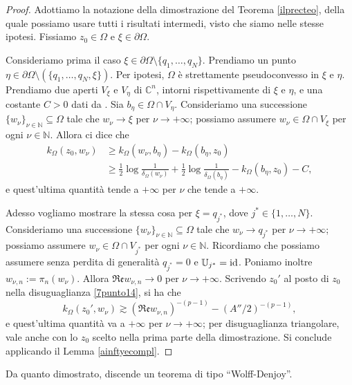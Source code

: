 \begin{proof}
    Adottiamo la notazione della dimostrazione del Teorema \ref{ilprecteo}, della quale possiamo usare tutti i risultati intermedi, visto che siamo nelle stesse ipotesi. Fissiamo $z_0\in\Omega$ e $\xi\in\partial\Omega$.
    
    Consideriamo prima il caso $\xi\in\partial\Omega\setminus\{q_1,\dots,q_N\}$. Prendiamo un punto $\eta\in\partial\Omega\setminus(\{q_1,\dots,q_N,\xi\})$. Per ipotesi, $\Omega$ è strettamente pseudoconvesso in $\xi$ e $\eta$. Prendiamo due aperti $V_\xi$ e $V_\eta$ di $\mathbb{C}^n$, intorni rispettivamente di $\xi$ e $\eta$, e una costante $C>0$ dati da \cite[Corollary 2.4]{FR}. Sia $b_\eta\in\Omega\cap V_\eta$. Consideriamo una successione $\{w_\nu\}_{\nu\in\mathbb{N}}\subseteq\Omega$ tale che $w_\nu\longrightarrow\xi$ per $\nu\longrightarrow+\infty$; possiamo assumere $w_\nu\in\Omega\cap V_\xi$ per ogni $\nu\in\mathbb{N}$. Allora \cite[Corollary 2.4]{FR} ci dice che
    \begin{align*}
        k_\Omega(z_0,w_\nu)&\ge k_\Omega(w_\nu,b_\eta)-k_\Omega(b_\eta,z_0)\\
        &\ge \frac{1}{2}\log{\frac{1}{\delta_\Omega(w_\nu)}}+\frac{1}{2}\log{\frac{1}{\delta_\Omega(b_\eta)}}-k_\Omega(b_\eta,z_0)-C,
    \end{align*}
    e quest'ultima quantità tende a $+\infty$ per $\nu$ che tende a $+\infty$.

    Adesso vogliamo mostrare la stessa cosa per $\xi=q_{j^*}$, dove $j^*\in\{1,\dots,N\}$. Consideriamo una successione $\{w_\nu\}_{\nu\in\mathbb{N}}\subseteq\Omega$ tale che $w_\nu\longrightarrow q_{j^*}$ per $\nu\longrightarrow+\infty$; possiamo assumere $w_\nu\in\Omega\cap V_{j^*}$ per ogni $\nu\in\mathbb{N}$. Ricordiamo che possiamo assumere senza perdita di generalità $q_{j^*}=0$ e $\mathbb{U}_{j^*}=\operatorname{id}$. Poniamo inoltre $w_{\nu,n}:=\pi_n(w_\nu)$. Allora $\mathfrak{Re}w_{\nu,n}\longrightarrow0$ per $\nu\longrightarrow+\infty$. Scrivendo $z_0'$ al posto di $z_0$ nella disuguaglianza \eqref{7punto14}, si ha che
    $$k_\Omega(z_0',w_\nu)\gtrsim (\mathfrak{Re}w_{\nu,n})^{-(p-1)}-(A''/2)^{-(p-1)},$$
    e quest'ultima quantità va a $+\infty$ per $\nu\longrightarrow+\infty$; per disuguaglianza triangolare, vale anche con lo $z_0$ scelto nella prima parte della dimostrazione. Si conclude applicando il Lemma \ref{ainftyecompl}.
\end{proof}

Da quanto dimostrato, discende un teorema di tipo ``Wolff-Denjoy''.

